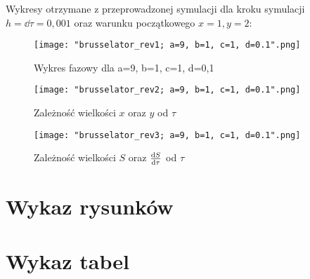\documentclass[10pt, a4paper, twoside, onecolumn]{article}
\numberwithin{equation}{section}
\begin{document}
	Wykresy otrzymane z przeprowadzonej symulacji dla kroku symulacji \(h = \dd{\tau} = 0,001\) oraz warunku początkowego \(x=1, y=2\):
	\begin{figure}[H]
		\centering
		\texttt{[image: "brusselator\_rev1; a=9, b=1, c=1, d=0.1".png]}
		\caption{Wykres fazowy dla a=9, b=1, c=1, d=0,1}
	\end{figure}
	\begin{figure}[H]
		\centering
		\texttt{[image: "brusselator\_rev2; a=9, b=1, c=1, d=0.1".png]}
		\caption{Zależność wielkości \(x\) oraz \(y\) od \(\tau\)}
	\end{figure}
	\begin{figure}[H]
		\centering
		\texttt{[image: "brusselator\_rev3; a=9, b=1, c=1, d=0.1".png]}
		\caption{Zależność wielkości \(S\) oraz \(\dv{S}{\tau}\) od \(\tau\)}
	\end{figure}
	
	
	\pagebreak
	\printbibliography[title=Wykaz literatury]
	\pagebreak
	\section*{Wykaz rysunków}
	\pagebreak
	\section*{Wykaz tabel}
	\pagebreak
	
\end{document}

